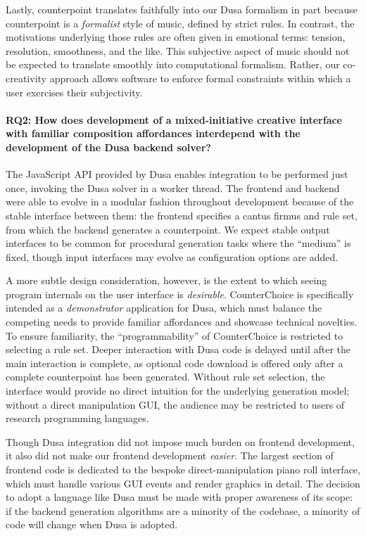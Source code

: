 Lastly, counterpoint translates faithfully into our Dusa formalism in part because counterpoint is a \emph{formalist} style of music, defined by strict rules.
In contrast, the motivations underlying those rules are often given in emotional terms: tension, resolution, smoothness, and the like.
This subjective aspect of music should not be expected to translate smoothly into computational formalism. 
Rather, our co-creativity approach allows software to enforce formal constraints within which a user exercises their subjectivity.

\paragraph{RQ2: How does development of a mixed-initiative creative  interface with familiar 
    composition affordances interdepend with the development of the Dusa backend solver?}

The JavaScript API provided by Dusa enables integration to be performed just once, invoking the Dusa solver in a worker thread.
The frontend and backend were able to evolve in a modular fashion throughout development because of the stable interface between them: the frontend specifies a cantus firmus and rule set, from which the backend generates a counterpoint.
We expect stable output interfaces to be common for procedural generation tasks where the ``medium'' is fixed, though input interfaces may evolve as configuration options are added.

A more subtle design consideration, however, is the extent to which seeing program internals on the user interface is \emph{desirable}.
CounterChoice is specifically intended as a \emph{demonstrator} application for Dusa, which must balance the competing needs to provide familiar affordances and showcase technical novelties.
To ensure familiarity, the ``programmability'' of CounterChoice is restricted to selecting a rule set.
Deeper interaction with Dusa code is delayed until after the main interaction is complete, as optional code download is offered only after a complete counterpoint has been generated.
Without rule set selection, the interface would provide no direct intuition for the underlying generation model; 
without a direct manipulation GUI, the audience may be restricted to users of research programming languages.

Though Dusa integration did not impose much burden on frontend development, it also did not make our frontend development \emph{easier}.
The largest section of frontend code is dedicated to the bespoke direct-manipulation piano roll interface, which must handle various GUI events and render graphics in detail.
The decision to adopt a language like Dusa must be made with proper awareness of its scope: if the backend generation algorithms are a minority of the codebase, a minority of code will change when Dusa is adopted.

